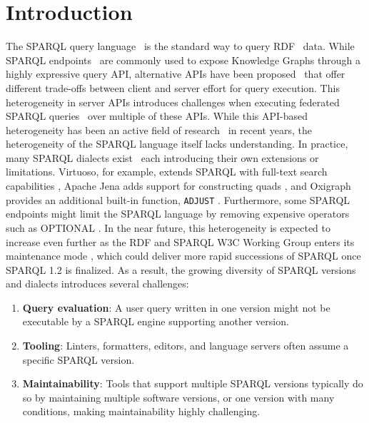 \documentclass[runningheads]{llncs}
\begin{document}
    \section{Introduction}
    \label{introduction}

    The SPARQL query language~\cite{spec:sparqllang} is the standard way to query RDF~\cite{spec:rdf} data.
    While SPARQL endpoints~\cite{spec:sparqlprot} are commonly used to expose Knowledge Graphs through a highly expressive query API,
    alternative APIs have been proposed~\cite{tpf,smartkg,sage,wisekg,brtpf,passage} that offer different trade-offs between client and server effort for query execution.
    This heterogeneity in server APIs introduces challenges when executing federated SPARQL queries~\cite{spec:sparqlfed,fedx,hibiscus,splendid,hanski_wikidata_federation_2025} over multiple of these APIs.
    While this API-based heterogeneity has been an active field of research~\cite{comunica,heterogeneous_lars,heterogeneous_fedqpl,heterogeneous_replicas} in recent years,
    the heterogeneity of the SPARQL language itself lacks understanding.
    In practice, many SPARQL dialects exist~\cite{geosparql,tsparql,csparql,rdfversioningquerylang} each introducing their own extensions or limitations.
    Virtuoso, for example, extends SPARQL with full-text search capabilities \cite{virtuoso-full-text-search},
    Apache Jena adds support for constructing quads \cite{jena-construct-quad},
    and Oxigraph provides an additional built-in function, \texttt{ADJUST} \cite{sparql-adjust,oxigraph-adjust}.
    Furthermore, some SPARQL endpoints might limit the SPARQL language
    by removing expensive operators such as OPTIONAL \cite{querycomplexity}.
    In the near future, this heterogeneity is expected to increase even further as the RDF and SPARQL W3C Working Group enters its
    maintenance mode \cite{rdf12-charter,modular-parsing},
    which could deliver more rapid successions of SPARQL once SPARQL 1.2 is finalized.
    As a result, the growing diversity of SPARQL versions and dialects introduces several challenges:

    \begin{enumerate}
        \item \textbf{Query evaluation}: A user query written in one version might not be executable by a SPARQL engine supporting another version.
        \item \textbf{Tooling}: Linters, formatters, editors, and language servers often assume a specific SPARQL version.
        \item \textbf{Maintainability}: Tools that support multiple SPARQL versions typically do so by maintaining multiple software versions, or one version with many conditions, making maintainability highly challenging.
    \end{enumerate}
\end{document}

